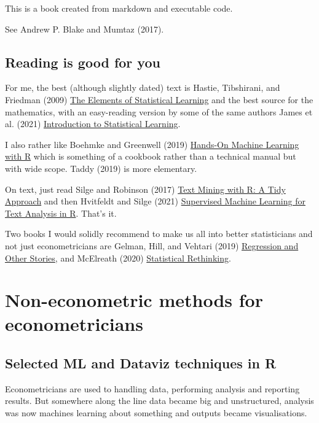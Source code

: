 \documentclass[
  letterpaper,
]{book}
\begin{document}
This is a book created from markdown and executable code.

See Andrew P. Blake and Mumtaz (2017).

\hypertarget{reading-is-good-for-you}{%
\section{Reading is good for you}\label{reading-is-good-for-you}}

For me, the best (although slightly dated) text is Hastie, Tibshirani,
and Friedman (2009)
\href{https://web.stanford.edu/~hastie/ElemStatLearn/}{The Elements of
Statistical Learning} and the best source for the mathematics, with an
easy-reading version by some of the same authors James et al. (2021)
\href{https://www.statlearning.com/}{Introduction to Statistical
Learning}.

I also rather like Boehmke and Greenwell (2019)
\href{https://bradleyboehmke.github.io/HOML/}{Hands-On Machine Learning
with R} which is something of a cookbook rather than a technical manual
but with wide scope. Taddy (2019) is more elementary.

On text, just read Silge and Robinson (2017)
\href{https://www.tidytextmining.com/}{Text Mining with R: A Tidy
Approach} and then Hvitfeldt and Silge (2021)
\href{https://smltar.com/}{Supervised Machine Learning for Text Analysis
in R}. That's it.

Two books I would solidly recommend to make us all into better
statisticians and not just econometricians are Gelman, Hill, and Vehtari
(2019) \href{http://www.stat.columbia.edu/~gelman/regression}{Regression
and Other Stories}, and McElreath (2020)
\href{https://github.com/rmcelreath/rethinking}{Statistical Rethinking}.

\hypertarget{non-econometric-methods-for-econometricians}{%
\chapter{Non-econometric methods for
econometricians}\label{non-econometric-methods-for-econometricians}}

\hypertarget{selected-ml-and-dataviz-techniques-in-r}{%
\section{Selected ML and Dataviz techniques in
R}\label{selected-ml-and-dataviz-techniques-in-r}}

Econometricians are used to handling data, performing analysis and
reporting results. But somewhere along the line data became big and
unstructured, analysis was now machines learning about something and
outputs became visualisations.
\end{document}
